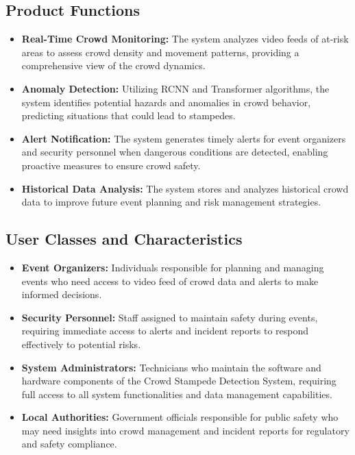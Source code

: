 \documentclass[11pt]{report}
\begin{document}
\subsection{Product Functions}
\begin{itemize}
    \item \textbf{Real-Time Crowd Monitoring:} The system analyzes video feeds of at-risk areas to assess crowd density and movement patterns, providing a comprehensive view of the crowd dynamics.
    \item \textbf{Anomaly Detection:} Utilizing RCNN and Transformer algorithms, the system  identifies potential hazards and anomalies in crowd behavior, predicting situations that could lead to stampedes.
    \item \textbf{Alert Notification:} The system generates timely alerts for event organizers and security personnel when dangerous conditions are detected, enabling proactive measures to ensure crowd safety.
    \item \textbf{Historical Data Analysis:} The system stores and analyzes historical crowd data to improve future event planning and risk management strategies.
\end{itemize}

\subsection{User Classes and Characteristics}
\begin{itemize}
    \item \textbf{Event Organizers:} Individuals responsible for planning and managing events who need access to video feed of crowd data and alerts to make informed decisions.
    \item \textbf{Security Personnel:} Staff assigned to maintain safety during events, requiring immediate access to alerts and incident reports to respond effectively to potential risks.
    \item \textbf{System Administrators:} Technicians who maintain the software and hardware components of the Crowd Stampede Detection System, requiring full access to all system functionalities and data management capabilities.
    \item \textbf{Local Authorities:} Government officials responsible for public safety who may need insights into crowd management and incident reports for regulatory and safety compliance.
\end{itemize}
\end{document}
